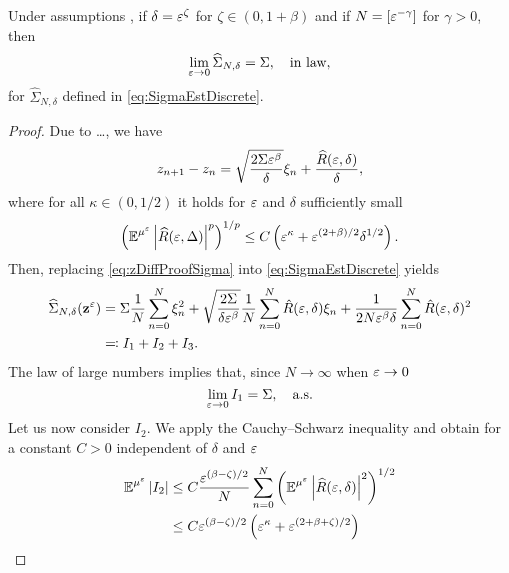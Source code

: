 \documentclass[10pt]{article}
\begin{document}
\begin{theorem} Under assumptions , if $\delta = \varepsilon^\zeta$ for $\zeta \in (0, 1+\beta)$ and if $N = [\varepsilon^{-\gamma}]$ for $\gamma > 0$, then 
	\begin{equation}
	\lim_{\varepsilon \to 0} \widehat \Sigma_{N, \delta} = \Sigma, \quad \text{in law},
	\end{equation}
	for $\widehat \Sigma_{N, \delta}$ defined in \eqref{eq:SigmaEstDiscrete}.
\end{theorem}
\begin{proof} Due to \ldots, we have
	\begin{equation}\label{eq:zDiffProofSigma}
		z_{n+1} - z_n = \sqrt{\frac{2\Sigma\varepsilon^\beta}{\delta}}\xi_n + \frac{\widehat R(\varepsilon, \delta)}{\delta},
	\end{equation}
	where for all $\kappa \in (0, 1/2)$ it holds for $\varepsilon$ and $\delta$ sufficiently small
	\begin{equation}
		\left(\operatorname{\mathbb{E}}^{\mu^\varepsilon}\left\lvert\widehat R(\varepsilon, \Delta)\right\rvert^p\right)^{1/p} \leq C\left(\varepsilon^\kappa + \varepsilon^{(2+\beta)/2}\delta^{1/2}\right).
	\end{equation}
	Then, replacing \eqref{eq:zDiffProofSigma} into \eqref{eq:SigmaEstDiscrete} yields
	\begin{equation}
	\begin{aligned}
		\widehat\Sigma_{N, \delta}(\mathbf z^\varepsilon) &= \Sigma \frac1N \sum_{n=0}^N \xi_n^2 + \sqrt{\frac{2\Sigma}{\delta\varepsilon^\beta}} \frac1N \sum_{n=0}^N \hat R(\varepsilon, \delta)\xi_n
		+ \frac1{2N\varepsilon^\beta\delta}\sum_{n=0}^N\hat R(\varepsilon, \delta)^2\\
		&\eqqcolon I_1 + I_2 + I_3.
	\end{aligned}
	\end{equation}
	The law of large numbers implies that, since $N\to\infty$ when $\varepsilon \to 0$
	\begin{equation}
		\lim_{\varepsilon\to 0}I_1 = \Sigma, \quad \text{a.s.}
	\end{equation}
	Let us now consider $I_2$. We apply the Cauchy--Schwarz inequality and obtain for a constant $C > 0$ independent of $\delta$ and $\varepsilon$
	\begin{equation}
	\begin{aligned}
		\E^{\mu^\epl}\abs{I_2} &\leq C \frac{\epl^{(\beta - \zeta)/2}}{N} \sum_{n=0}^N \left(\E^{\mu^\epl} \abs{\widehat R(\epl, \delta)}^2 \right)^{1/2}\\
		&\leq C \epl^{(\beta - \zeta)/2}\left(\epl^\kappa + \epl^{(2+\beta+\zeta)/2} \right)\\

\end{aligned}
\end{equation}
\end{proof}
\end{document}
